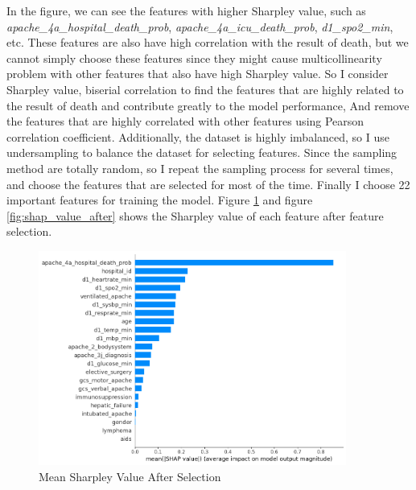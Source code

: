 \documentclass[a4paper, oneside, final, 12pt]{scrartcl} %
\begin{document}
\clearpage

In the figure, we can see the features with higher Sharpley value,
such as \emph{apache\_4a\_hospital\_death\_prob}, \emph{apache\_4a\_icu\_death\_prob},
\emph{d1\_spo2\_min}, etc. 
These features are also have high correlation with the result of death,
but we cannot simply choose these features since they might cause
multicollinearity problem with other features that also have high Sharpley value.
So I consider Sharpley value, biserial correlation to find the features that 
are highly related to the result of death and contribute greatly to the model performance,
And remove the features that are highly correlated with other features using Pearson correlation coefficient.
Additionally, the dataset is highly imbalanced, so I use undersampling to balance the dataset for selecting features.
Since the sampling method are totally random, so I repeat the sampling process for several times,
and choose the features that are selected for most of the time.
Finally I choose 22 important features for training the model.
Figure \ref{fig:shap_mean_after} and figure \ref{fig:shap_value_after} shows the Sharpley value of each feature after feature selection.

\begin{figure}[h]
  \centering
  \includegraphics[width=0.9\textwidth]{"./image/shap_mean.png"}
  \caption{Mean Sharpley Value After Selection}
  \label{fig:shap_mean_after}
\end{figure}
\end{document}
